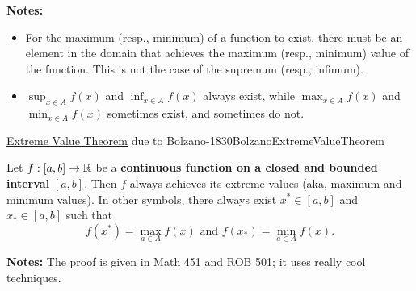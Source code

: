 \begin{tcolorbox}[colback=mylightblue, title = {\bf Extremal Values of a Function (or a Function's Range)}, breakable]
\begin{definition}
\end{definition}
\textbf{Notes:}
\begin{itemize}

    \item For the maximum (resp., minimum) of a function to exist, there must be an element in the domain that achieves the maximum (resp., minimum) value of the function. This is not the case of the supremum (resp., infimum).
    
    \item $\displaystyle \sup_{x\in A} f(x)$ and $\displaystyle \inf_{x\in A} f(x)$ always exist, while $\displaystyle  \max_{x\in A} f(x)$ and $\displaystyle \min_{x\in A} f(x)$ sometimes exist, and sometimes do not.
    
\end{itemize}
\end{tcolorbox}

 \bigskip

\begin{propColor}{\href{https://en.wikipedia.org/wiki/Extreme_value_theorem}{Extreme Value Theorem} due to Bolzano-1830}{BolzanoExtremeValueTheorem}

Let $f:[a, b] \to \mathbb R$ be a \textbf{continuous function on a closed and bounded interval} $[a, b]$. Then $f$ always achieves its extreme values (aka, maximum and minimum values). In other symbols, there always exist $x^\ast \in [a, b]$ and $x_\ast \in [a, b]$ such that 
$$f(x^\ast) =  \max_{a \in A} f(x) \text{ and } f(x_\ast) =  \min_{a \in A} f(x).$$

\textbf{Notes:} The proof is given in Math 451 and ROB 501; it uses really cool techniques. 
    
\end{propColor}

\bigskip

